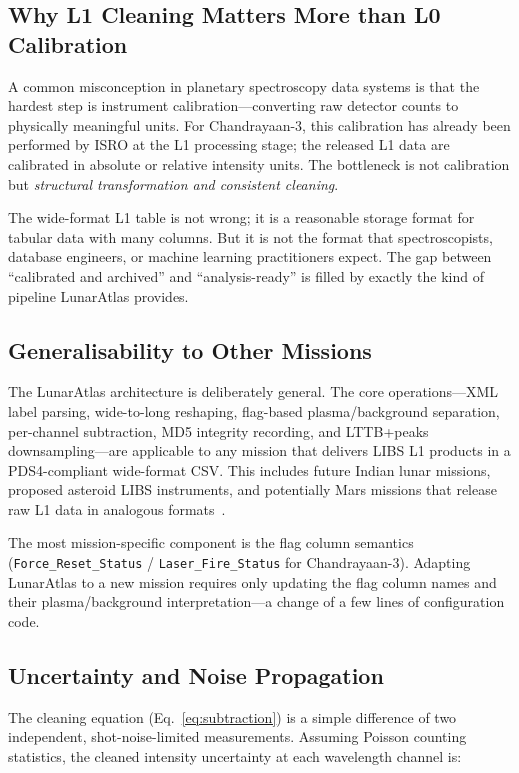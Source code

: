 \documentclass[a4paper,twocolumn,10pt]{article}
\begin{document}
\subsection{Why L1 Cleaning Matters More than L0 Calibration}

A common misconception in planetary spectroscopy data systems is that
the hardest step is instrument calibration---converting raw detector
counts to physically meaningful units.  For Chandrayaan-3, this
calibration has already been performed by ISRO at the L1 processing
stage; the released L1 data are calibrated in absolute or relative
intensity units.  The bottleneck is not calibration but
\emph{structural transformation and consistent cleaning}.

The wide-format L1 table is not wrong; it is a reasonable storage
format for tabular data with many columns.  But it is not the format
that spectroscopists, database engineers, or machine learning
practitioners expect.  The gap between ``calibrated and archived'' and
``analysis-ready'' is filled by exactly the kind of pipeline LunarAtlas
provides.

\subsection{Generalisability to Other Missions}

The LunarAtlas architecture is deliberately general.  The core
operations---XML label parsing, wide-to-long reshaping, flag-based
plasma/background separation, per-channel subtraction, MD5
integrity recording, and LTTB+peaks downsampling---are applicable to
any mission that delivers LIBS L1 products in a PDS4-compliant
wide-format CSV.  This includes future Indian lunar missions, proposed
asteroid LIBS instruments, and potentially Mars missions that release
raw L1 data in analogous formats~\cite{Saeidfirozeh2024}.

The most mission-specific component is the flag column semantics
(\texttt{Force\_Reset\_Status} / \texttt{Laser\_Fire\_Status} for
Chandrayaan-3).  Adapting LunarAtlas to a new mission requires only
updating the flag column names and their
plasma/background interpretation---a change of a few lines of
configuration code.

\subsection{Uncertainty and Noise Propagation}

The cleaning equation (Eq.~\ref{eq:subtraction}) is a simple
difference of two independent, shot-noise-limited measurements.
Assuming Poisson counting statistics, the cleaned intensity
uncertainty at each wavelength channel is:
\end{document}
